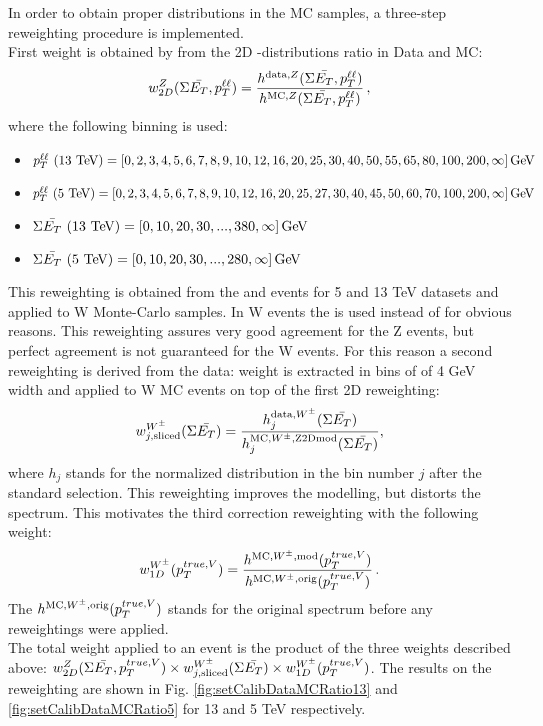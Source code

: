 	 In order to obtain proper distributions in the MC samples, a three-step reweighting procedure is implemented. \\
	 First weight is obtained by from the 2D \setue-\ptv distributions ratio in Data and MC:
	 \begin{equation}
	 w_{2D}^{Z}(\Sigma \bar{E_T} , p_{T}^{\ell\ell}) = \frac{h^{\mathrm{data}, Z}(\Sigma \bar{E_T} , p_{T}^{\ell\ell})}{h^{\mathrm{MC}, Z}(\Sigma \bar{E_T} , p_{T}^{\ell\ell})}\,,
	 \end{equation}
	 where the following binning is used:
	 \begin{itemize}
	 	\item $p_{T}^{\ell\ell}~(13~\text{Te\kern -0.1em V}) = [ 0, 2, 3, 4, 5, 6, 7, 8, 9, 10, 12, 16, 20, 25, 30, 40, 50, 55, 65, 80, 100, 200, \infty]\,\text{Ge\kern -0.1em V}$
	 	\item $p_{T}^{\ell\ell}~(5~\text{Te\kern -0.1em V}) = [ 0, 2, 3, 4, 5, 6, 7, 8, 9, 10, 12, 16, 20, 25, 27, 30, 40, 45, 50, 60, 70, 100, 200, \infty]\,\text{Ge\kern -0.1em V}$
	 	\item $\Sigma \bar{E_T} ~(13~\text{Te\kern -0.1em V}) = [ 0, 10, 20, 30, ... , 380, \infty]\,\text{Ge\kern -0.1em V}$
	 	\item $\Sigma \bar{E_T} ~(5~\text{Te\kern -0.1em V}) = [ 0, 10, 20, 30, ... , 280, \infty]\,\text{Ge\kern -0.1em V}$
	 \end{itemize}
     This reweighting is obtained from the \Zmm and \Zee events for 5 and 13 TeV datasets and applied to W Monte-Carlo samples. In W events the \ptv{} is used instead of \ptll{} for obvious reasons. This reweighting assures very good agreement for the Z events, but perfect agreement is not guaranteed for the W events. For this reason a second reweighting is derived from the data: \setue weight is extracted in bins of \ut of 4 GeV width and applied to W MC events on top of the first 2D reweighting:
     \begin{equation}
     w_{j, \mathrm{sliced}}^{W^{\pm}}(\Sigma \bar{E_T} ) = \frac{h_{j}^{\mathrm{data}, W^{\pm}}(\Sigma \bar{E_T} )}{h_{j}^{\mathrm{MC}, W^{\pm}, \mathrm{Z2D mod}}(\Sigma \bar{E_T} )},
     \label{eq:1dslicedrew}
     \end{equation}
     where $h_j$ stands for the normalized \setue distribution in the \ut bin number $j$ after the standard selection. This reweighting improves the \setue modelling, but distorts the \ptv spectrum. This motivates the third correction reweighting with the following weight: 
     \begin{equation}
     w_{1D}^{W^{\pm}}(p_T^{true,V}) = \frac{h^{\mathrm{MC}, W^{\pm}, \mathrm{mod}}(p_T^{true,V})}{h^{\mathrm{MC}, W^{\pm}, \mathrm{orig}}(p_T^{true,V})}\,.
     \label{eq:1drew}
     \end{equation}
     The $h^{\mathrm{MC}, W^{\pm}, \mathrm{orig}}(p_T^{true,V})$ stands for the original \pttruthv spectrum before any reweightings were applied. \\
     The total weight applied to an event is the product of the three weights described above: $ w_{2D}^{Z}(\Sigma \bar{E_T} , p_T^{true,V}) \times w_{j, \mathrm{sliced}}^{W^{\pm}}(\Sigma \bar{E_T} ) \times
     w_{1D}^{W^{\pm}}(p_T^{true,V})$. The results on the reweighting are shown in Fig. \ref{fig:setCalibDataMCRatio13} and \ref{fig:setCalibDataMCRatio5} for 13 and 5 TeV respectively.\\
     
